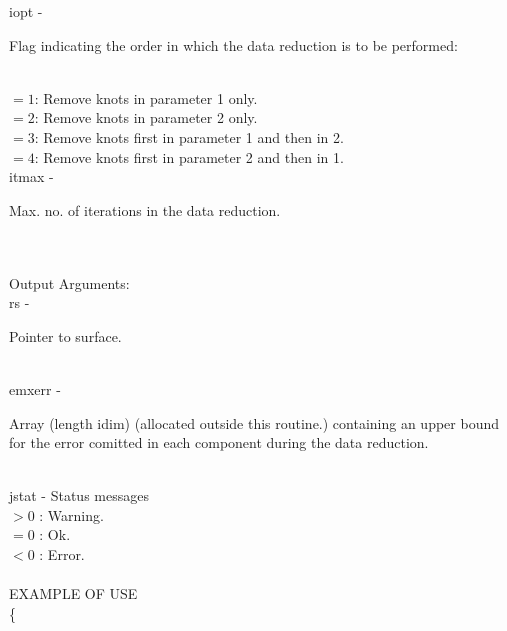         \>\>    {\fov iopt}\> - \>  \begin{minipg2}
                  Flag indicating the order in which the data reduction
                  is to be performed:
                               \end{minipg2}\\[0.8ex]
          \>\>\>\> $=1$: Remove knots in parameter 1 only.\\
          \>\>\>\> $=2$: Remove knots in parameter 2 only.\\
          \>\>\>\> $=3$: Remove knots first in parameter 1 and then in 2.\\
          \>\>\>\> $=4$: Remove knots first in parameter 2 and then in 1.\\
        \>\>    {\fov itmax}\> - \>  \begin{minipg2}
                    Max. no. of iterations in the data reduction.
                               \end{minipg2}\\[0.8ex]
\\
	\>Output Arguments:\\
        \>\>    {\fov rs}\> - \>  \begin{minipg2}
                     Pointer to surface.
                               \end{minipg2}\\[0.8ex]
        \>\>    {\fov emxerr}\> - \>  \begin{minipg2}
                     Array (length idim) (allocated outside this routine.)
                  containing an upper bound for the error comitted in
                  each component during the data reduction.
                               \end{minipg2}\\[0.8ex]
        \>\>    {\fov jstat}     \> - \> Status messages\\
                \>\>\>\>\>              $> 0$   : Warning.\\
                \>\>\>\>\>              $= 0$   : Ok.\\
                \>\>\>\>\>              $< 0$   : Error.\\
\\
EXAMPLE OF USE\\
		\>      \{ \\

